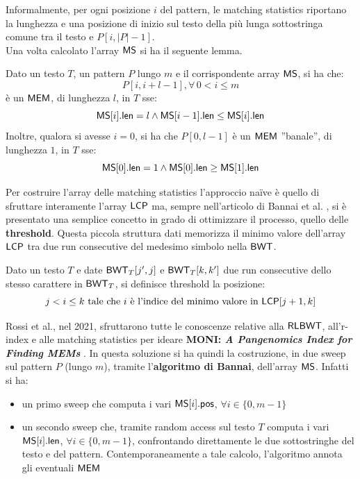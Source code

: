 \noindent
Informalmente, per ogni posizione $i$ del pattern, le
matching statistics riportano la lunghezza e 
una posizione di inizio sul testo della più lunga sottostringa comune tra il
testo e $P[i, |P|-1]$. \\
Una volta calcolato l'array $\mbox{\rm {\sf MS}}$ si ha il seguente lemma.
\begin{lemma}
  Dato un testo $T$, un pattern $P$ lungo $m$ e il
  corrispondente array $\mbox{\rm {\sf MS}}$, si ha che:
  \begin{equation}
    \label{eq:rlbwt5}
    P[i,i+l-1],\forall\, 0<i\leq m
  \end{equation}
  è un $\mbox{\rm {\sf MEM}}$, di lunghezza $l$, in $T$ sse:
  \begin{equation}
    \label{eq:rlbwt6}
    \mbox{\rm {\sf MS}}[i].\mbox{\rm {\sf len}}=l\land \mbox{\rm {\sf MS}}[i-1].\mbox{\rm {\sf len}}\leq \mbox{\rm {\sf MS}}[i].\mbox{\rm {\sf len}}
  \end{equation}
  Inoltre, qualora si avesse $i=0$, si ha che $P[0,l-1]$ è un $\mbox{\rm {\sf MEM}}$ 
  ''banale'', di lunghezza $1$, in $T$ sse:
  \begin{equation}
    \label{eq:rlbwt7}
    \mbox{\rm {\sf MS}}[0].\mbox{\rm {\sf len}}=1\land \mbox{\rm {\sf MS}}[0].\mbox{\rm {\sf len}}\geq \mbox{\rm {\sf MS}}[1].\mbox{\rm {\sf len}}
  \end{equation}
\end{lemma}
Per costruire l'array delle matching statistics l'approccio na\"{i}ve è quello di
sfruttare 
interamente l'array $\mbox{\rm {\sf LCP}}$ ma, sempre nell'articolo di Bannai et
al. \cite{bannai}, si è presentato una semplice concetto in grado di
ottimizzare il processo, quello delle \textbf{threshold}. Questa piccola
struttura dati memorizza il minimo valore dell'array $\mbox{\rm {\sf LCP}}$  tra due run
consecutive del medesimo simbolo nella $\mbox{\rm {\sf BWT}}$.
\begin{definizione}
  Dato un testo $T$ e date $\mbox{\rm {\sf BWT}}_T[j',j]$ e $\mbox{\rm {\sf BWT}}_T[k,k']$ due run consecutive
  dello stesso carattere in $\mbox{\rm {\sf BWT}}_T$, si definisce threshold la
  posizione:
  \begin{equation}
    \label{eq:rlbwt8}
    j< i \leq k\mbox{ tale che } i\mbox{ è l'indice del minimo valore in
    }\mbox{\rm {\sf LCP}}[j+1,k] 
  \end{equation}
\end{definizione}
Rossi et al., nel 2021, sfruttarono tutte le conoscenze relative
alla $\mbox{\rm {\sf RLBWT}}$, all'r-index e alle matching statistics
per ideare \textbf{MONI:\textit{ A Pangenomics Index for Finding MEMs}}
\cite{moni}. In questa soluzione si ha quindi la costruzione, in due
sweep sul pattern $P$ (lungo $m$), tramite l'\textbf{algoritmo di Bannai}, dell'array $\mbox{\rm {\sf MS}}$. Infatti si ha:
\begin{itemize}
  \item un primo sweep che computa i vari $\mbox{\rm {\sf MS}}[i].\mbox{\rm {\sf pos}}$, $\forall i\in\{0,m-1\}$
  \item un secondo sweep che, tramite random access sul testo $T$ computa i
  vari $\mbox{\rm {\sf MS}}[i].\mbox{\rm {\sf len}}$, $\forall i\in\{0,m-1\}$, confrontando direttamente 
  le due sottostringhe del testo e
  del pattern. Contemporaneamente a tale calcolo, l'algoritmo annota gli
  eventuali $\mbox{\rm {\sf MEM}}$
\end{itemize}
